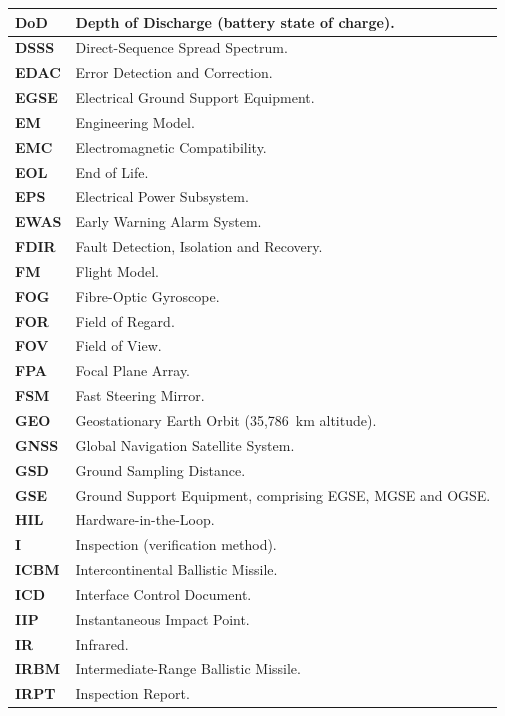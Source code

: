 {\begin{longtable}{|>{\raggedright\arraybackslash}p{3.2cm}|>{\raggedright\arraybackslash}p{12.2cm}|}
\textbf{DoD} & Depth of Discharge (battery state of charge). \\ \hline
\textbf{DSSS} & Direct-Sequence Spread Spectrum. \\ \hline
\textbf{EDAC} & Error Detection and Correction. \\ \hline
\textbf{EGSE} & Electrical Ground Support Equipment. \\ \hline
\textbf{EM} & Engineering Model. \\ \hline
\textbf{EMC} & Electromagnetic Compatibility. \\ \hline
\textbf{EOL} & End of Life. \\ \hline
\textbf{EPS} & Electrical Power Subsystem. \\ \hline
\textbf{EWAS} & Early Warning Alarm System. \\ \hline
\textbf{FDIR} & Fault Detection, Isolation and Recovery. \\ \hline
\textbf{FM} & Flight Model. \\ \hline
\textbf{FOG} & Fibre-Optic Gyroscope. \\ \hline
\textbf{FOR} & Field of Regard. \\ \hline
\textbf{FOV} & Field of View. \\ \hline
\textbf{FPA} & Focal Plane Array. \\ \hline
\textbf{FSM} & Fast Steering Mirror. \\ \hline
\textbf{GEO} & Geostationary Earth Orbit (35,786~km altitude). \\ \hline
\textbf{GNSS} & Global Navigation Satellite System. \\ \hline
\textbf{GSD} & Ground Sampling Distance. \\ \hline
\textbf{GSE} & Ground Support Equipment, comprising EGSE, MGSE and OGSE. \\ \hline
\textbf{HIL} & Hardware-in-the-Loop. \\ \hline
\textbf{I} & Inspection (verification method). \\ \hline
\textbf{ICBM} & Intercontinental Ballistic Missile. \\ \hline
\textbf{ICD} & Interface Control Document. \\ \hline
\textbf{IIP} & Instantaneous Impact Point. \\ \hline
\textbf{IR} & Infrared. \\ \hline
\textbf{IRBM} & Intermediate-Range Ballistic Missile. \\ \hline
\textbf{IRPT} & Inspection Report. \\ \hline

\end{longtable}}
